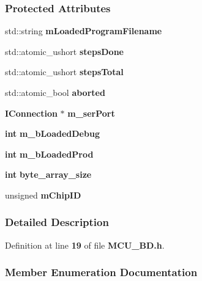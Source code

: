 \subsubsection*{Protected Attributes}
\begin{DoxyCompactItemize}
\item 
std\+::string {\bf m\+Loaded\+Program\+Filename}
\item 
std\+::atomic\+\_\+ushort {\bf steps\+Done}
\item 
std\+::atomic\+\_\+ushort {\bf steps\+Total}
\item 
std\+::atomic\+\_\+bool {\bf aborted}
\item 
{\bf I\+Connection} $\ast$ {\bf m\+\_\+ser\+Port}
\item 
{\bf int} {\bf m\+\_\+b\+Loaded\+Debug}
\item 
{\bf int} {\bf m\+\_\+b\+Loaded\+Prod}
\item 
{\bf int} {\bf byte\+\_\+array\+\_\+size}
\item 
unsigned {\bf m\+Chip\+ID}
\end{DoxyCompactItemize}


\subsubsection{Detailed Description}


Definition at line {\bf 19} of file {\bf M\+C\+U\+\_\+\+B\+D.\+h}.



\subsubsection{Member Enumeration Documentation}
